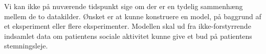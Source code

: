 Vi kan ikke på nuværende tidspunkt sige om der er en tydelig sammenhæng mellem de to datakilder. 
Ønsket er at kunne konstruere en model, på baggrund af et eksperiment eller flere eksperimenter.
Modellen skal ud fra ikke-forstyrrende indsamlet data om patientens sociale aktivitet kunne give et bud på patientens stemningsleje.